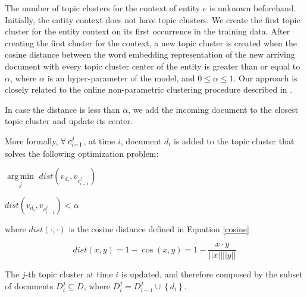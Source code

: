 \documentclass{article}
\DeclareMathOperator*{\argmin}{arg\,min}
\begin{document}
The number of topic clusters for the context of entity $e$ is unknown beforehand. Initially, the entity context does not have topic clusters. We create the first topic cluster for the entity context on its first occurrence in the training data. After creating the first cluster for the context, a new topic cluster is created when the cosine distance between the word embedding representation of the new arriving document with every topic cluster center of the entity is greater than or equal to $\alpha$, where $\alpha$ is an hyper-parameter of the model, and $0 \leq \alpha \leq 1$. Our approach is closely related to the online non-parametric clustering procedure described in \citet{Arvind14}.

In case the distance is less than $\alpha$, we add the incoming document to the closest topic cluster and update its center. 

More formally, $\forall\hspace{1mm}c^j_{i-1}$, at time $i$, document $d_i$ is added to the topic cluster that solves the following optimization problem:\\

\centerline{$\underset{j}{\argmin}$\;\; $dist(v_{d_i}, v_{c^j_{i-1}})$} 
\medskip
\centerline{ $dist(v_{d_i}, v_{c^j_{i-1}}) < \alpha$}

where $dist(\cdot,\cdot)$ is the cosine distance defined in Equation \ref{cosine}

\begin{equation}
\label{cosine}
dist(x,y) = 1 - \cos(x,y) = 1 - \frac{x \cdot y}{||x||||y||}
\end{equation}

The $j$-th topic cluster at time $i$ is updated, and therefore composed by the subset of documents $D^j_i \subseteq D$, where $D^j_i = D^j_{i-1} \cup \left\{ {d_i}\right\}$.

\end{document}
